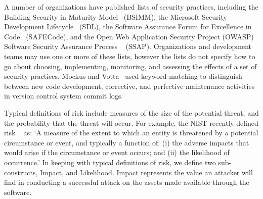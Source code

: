 A number of organizations have published lists of security practices, including the Building Security in Maturity Model~\cite{mcgraw2013bsimm} (BSIMM), the Microsoft Security Development Lifecycle~\cite{howard2009security} (SDL), the Software Assurance Forum for Excellence in Code~\cite{simpson2013fundamental} (SAFECode), and the Open Web Application Security Project (OWASP) Software Security Assurance Process ~\cite{martinez2014ssap} (SSAP). Organizations and development teams may use one or more of these lists, however the lists do not specify how to go about choosing, implementing, monitoring, and assessing the effects of a set of security practices.
 Mockus and Votta~\cite{mockus2000identifying} used keyword matching to distinguish between new code development, corrective, and perfective maintenance activities in version control system commit logs.

Typical definitions of risk include measures of the size of the potential threat, and the probability that the threat will occur. For example, the NIST recently defined risk ~\cite{nist2011managing} as: `A measure of the extent to which an entity is threatened by a potential circumstance or event, and typically a function of: (i) the adverse impacts that would arise if the circumstance or event occurs; and (ii) the likelihood of occurrence.' In keeping with typical definitions of risk, we define two sub-constructs, Impact, and Likelihood. Impact represents the value an attacker will find in conducting a successful attack on the assets made available through the software.

